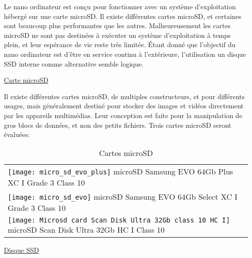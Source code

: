 \par Le nano ordinateur est conçu pour fonctionner avec un système d'exploitation hébergé sur une carte microSD. Il existe différentes cartes microSD, et certaines sont  beaucoup plus performantes que les autres. Malheureusement les cartes microSD ne sont pas destinées à exécuter un système d'exploitation à temps plein, et leur espérance de vie reste très limitée.  Étant donné que l'objectif du nano ordinateur est d'être en service continu à l'extérieure, l'utilisation un disque SSD interne comme alternative semble logique.
\par\underline{Carte microSD}
\par Il existe différentes cartes microSD, de multiples constructeurs, et pour différents usages, mais généralement destiné pour stocker des images et vidéos directement par les appareils multimédias. Leur conception est faite pour la manipulation de gros blocs de données, et non des petits fichiers. Trois cartes microSD 
seront évaluées:
{
    \renewcommand*{\arraystretch}{1.4}
    \begin{table}[ht]
    \centering
    \caption{Cartes microSD}\label{table:cartes_microSD}
    \vspace{0.3em} %
    \begin{tabular}{l}
        \texttt{[image: micro\_sd\_evo\_plus]} microSD Samsung EVO 64Gb Plus XC I Grade 3 Class 10\\
        \texttt{[image: micro\_sd\_evo]} microSD Samsung EVO 64Gb Select XC I Grade 3 Class 10\\
        \texttt{[image: Microsd card Scan Disk Ultra 32Gb class 10 HC I]} microSD Scan Disk Ultra 32Gb HC I Class 10\\
    \end{tabular}
    \end{table}
}
{\color{red}}
\par\underline{Disque SSD}
